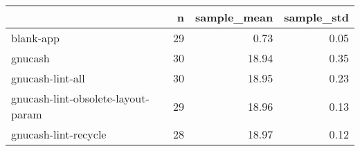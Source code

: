 \begin{tabular}{lrrr}
\toprule
{} &   n &  sample\_mean &  sample\_std \\
\midrule
blank-app                          &  29 &         0.73 &        0.05 \\
gnucash                            &  30 &        18.94 &        0.35 \\
gnucash-lint-all                   &  30 &        18.95 &        0.23 \\
gnucash-lint-obsolete-layout-param &  29 &        18.96 &        0.13 \\
gnucash-lint-recycle               &  28 &        18.97 &        0.12 \\
\bottomrule
\end{tabular}
